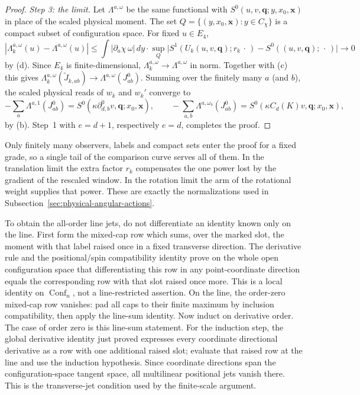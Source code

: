 \begin{proof}
\emph{Step 3: the limit.}  Let $\Lambda^{a,\omega}$ be the same functional
with $S^0(u,v,\boldsymbol q;y,x_0,\boldsymbol x)$ in place of the scaled
physical moment.  The set
$Q=\{(y,x_0,\boldsymbol x):y\in C_\chi\}$ is a compact subset of
configuration space.  For fixed $u\in E_4$,
\[
 |\Lambda^{a,\omega}_k(u)-\Lambda^{a,\omega}(u)|
 \le\int|\partial_a\chi\,\omega|\,dy\cdot
   \sup_Q\bigl|S^1(U_k(u,v,\boldsymbol q);r_k\,\cdot\,)
               -S^0((u,v,\boldsymbol q);\,\cdot\,)\bigr|\to0
\]
by (d).  Since $E_4$ is finite-dimensional, $\Lambda^{a,\omega}_k\to
\Lambda^{a,\omega}$ in norm.  Together with (c) this gives
$\Lambda^{a,\omega}_k(\widetilde J_{k,ab})\to\Lambda^{a,\omega}(J^0_{ab})$.
Summing over the finitely many $a$ (and $b$), the scaled physical reads of
$w_k$ and $w_k'$ converge to
\[
 -\sum_a\Lambda^{a,1}(J^0_{ab})
   =S^0(\kappa\partial^0_{d,b}v,\boldsymbol q;x_0,\boldsymbol x),
 \qquad
 -\sum_{a,b}\Lambda^{a,\omega_b}(J^0_{ab})
   =S^0(\kappa C_d(K)v,\boldsymbol q;x_0,\boldsymbol x),
\]
by (b).  Step~1 with $e=d+1$, respectively $e=d$, completes the proof.
\end{proof}

Only finitely many observers, labels and compact sets enter the proof for
a fixed grade, so a single tail of the comparison curve serves all of them.
In the translation limit the extra factor $r_k$ compensates the one power
lost by the gradient of the rescaled window.  In the rotation limit the
arm of the rotational weight supplies that power.  These are exactly the
normalizations used in Subsection~\ref{sec:physical-angular-actions}.

To obtain the all-order line jets, do not differentiate an identity known
only on the line.  First form the mixed-cap row which sums, over the marked
slot, the moment with that label raised once in a fixed transverse direction.
The derivative rule and the positional/spin compatibility identity prove
on the whole open configuration space that differentiating this row in any
point-coordinate direction equals the corresponding row with that slot
raised once more.  This is a local identity on $\operatorname{Conf}_n$,
not a line-restricted assertion.  On the line, the order-zero mixed-cap row
vanishes: pad all caps to their finite maximum by inclusion compatibility,
then apply the line-sum identity.  Now induct on derivative order.  The
case of order zero is this line-sum statement.  For the induction step, the
global derivative identity just proved expresses every coordinate
directional derivative as a row with one additional raised slot; evaluate
that raised row at the line and use the induction hypothesis.  Since
coordinate directions span the configuration-space tangent space, all
multilinear positional jets vanish there.  This is the transverse-jet
condition used by the finite-scale argument.


